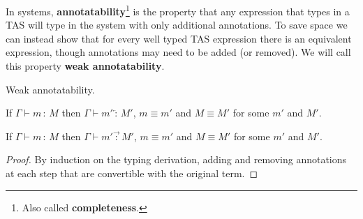 In \bidir{} systems, \textbf{annotatability}\footnote{
  Also called \textbf{completeness}.
} is the property that any expression that types in a \ac{TAS} will type in the \bidir{} system with only additional annotations. 
To save space we can instead show that for every well typed \ac{TAS} expression there is an equivalent \bidir{} expression, though annotations may need to be added (or removed). %
We will call this property \textbf{weak annotatability}.
\begin{thm} Weak annotatability.
 
If $\Gamma\vdash m\,:\,M$ then $\Gamma\vdash m'\overleftarrow{\,:\,}M'$, $m\equiv m'$ and $M\equiv M'$ for some $m'$ and $M'$.
 
If $\Gamma\vdash m\,:\,M$ then $\Gamma\vdash m'\overrightarrow{\,:\,}M'$, $m\equiv m'$ and $M\equiv M'$ for some $m'$ and $M'$.
\end{thm}
 
\begin{proof}
By induction on the typing derivation, adding and removing annotations at each step that are convertible with the original term.
\end{proof}
